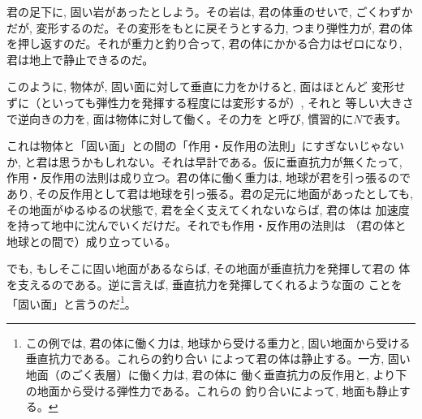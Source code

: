 君の足下に, 固い岩があったとしよう。その岩は, 君の体重のせいで, 
ごくわずかだが, 変形するのだ。その変形をもとに戻そうとする力, 
つまり弾性力が, 君の体を押し返すのだ。それが重力と釣り合って, 
君の体にかかる合力はゼロになり, 君は地上で静止できるのだ。

このように, 物体が, 固い面に対して垂直に力をかけると, 面はほとんど
変形せずに（といっても弾性力を発揮する程度には変形するが）, それと
等しい大きさで逆向きの力を, 面は物体に対して働く。その力を
と呼び, 慣習的に$N$で表す。

これは物体と「固い面」との間の「作用・反作用の法則」にすぎないじゃないか, 
と君は思うかもしれない。それは早計である。仮に垂直抗力が無くたって, 
作用・反作用の法則は成り立つ。君の体に働く重力は, 地球が君を引っ張るので
あり, その反作用として君は地球を引っ張る。君の足元に地面があったとしても, 
その地面がゆるゆるの状態で, 君を全く支えてくれないならば, 君の体は
加速度を持って地中に沈んでいくだけだ。それでも作用・反作用の法則は
（君の体と地球との間で）成り立っている。

でも, もしそこに固い地面があるならば, その地面が垂直抗力を発揮して君の
体を支えるのである。逆に言えば, 垂直抗力を発揮してくれるような面の
ことを「固い面」と言うのだ\footnote{この例では, 君の体に働く力は, 
地球から受ける重力と, 固い地面から受ける垂直抗力である。これらの釣り合い
によって君の体は静止する。一方, 固い地面（のごく表層）に働く力は, 君の体に
働く垂直抗力の反作用と, より下の地面から受ける弾性力である。これらの
釣り合いによって, 地面も静止する。}。

